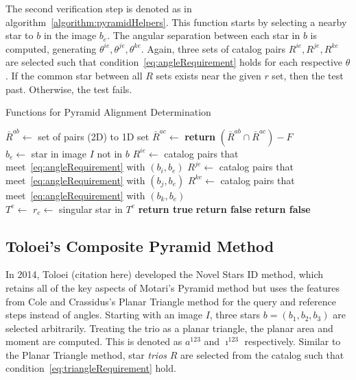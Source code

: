 The second verification step is denoted as  in
algorithm~\autoref{algorithm:pyramidHelpers}. This function starts by selecting a nearby star to $b$ in the image $b_e$.
The angular separation between each star in $b$ is computed, generating $\theta^{ie}, \theta^{je}, \theta^{ke}$.
Again, three sets of catalog pairs $R^{ie}, R^{je}, R^{ke}$ are selected such that
condition~\eqref{eq:angleRequirement} holds for each respective $\theta$. If the common star between all $R$ sets
exists near the given $r$ set, then the test past. Otherwise, the test fails.

\begin{algorithm}
    \caption{Functions for Pyramid Alignment Determination} \label{algorithm:pyramidHelpers}
    \begin{algorithmic}[1]
        \State $\bar{R}^{ab} \gets $  \Comment set of pairs (2D) to 1D set
        \State $\bar{R}^{ac} \gets $ 
        \State \textbf{return} $(\bar{R}^{ab} \cap \bar{R}^{ac}) - F$
        \EndFunction
        \\
        \State $b_e \gets $ star in image $I$ not in $b$
        \State $R^{ie} \gets$ catalog pairs that meet~\eqref{eq:angleRequirement} with $(b_i, b_e)$
        \State $R^{je} \gets$ catalog pairs that meet~\eqref{eq:angleRequirement} with $(b_j, b_e)$
        \State $R^{ke} \gets$ catalog pairs that meet~\eqref{eq:angleRequirement} with $(b_k, b_e)$
        \\
        \State $T^e \gets $ 
        \State $r_e \gets $ singular star in $T^e$
        \State \textbf{return true}
        \Else
        \State \textbf{return false}
        \EndIf
        \Else
        \State \textbf{return false}
        \EndIf
        \EndFunction
    \end{algorithmic}
\end{algorithm}

\subsection{Toloei's Composite Pyramid Method}\label{subsec:toloei'sCompositePyramidMethod}
In 2014, Toloei (citation here) developed the Novel Stars ID method, which retains all of the key aspects of Motari's
Pyramid method but uses the features from Cole and Crassidus's Planar Triangle method for the query and reference steps
instead of angles. Starting with an image $I$, three stars $b = (b_1, b_2, b_3)$ are selected arbitrarily. Treating the
trio as a planar triangle, the planar area and moment are computed. This is denoted as $a^{123}$ and $\imath^{123}$
respectively. Similar to the Planar Triangle method, star \textit{trios} $R$ are selected from the catalog such that
condition~\eqref{eq:triangleRequirement} hold.

